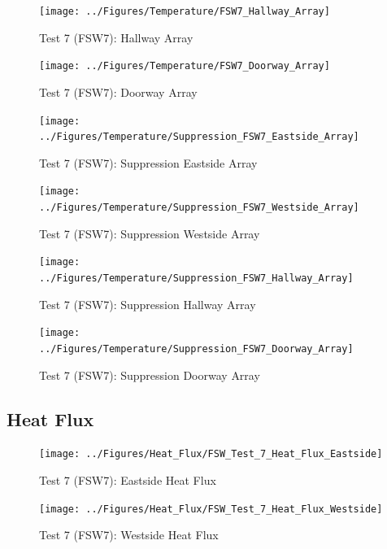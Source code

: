 \documentclass[12pt,oneside]{book}
\begin{document}
\begin{figure}[!ht]
	\texttt{[image: ../Figures/Temperature/FSW7\_Hallway\_Array]}
	\caption{Test 7 (FSW7): Hallway Array}
	\label{fig:Test_7_Hallway_Array}
\end{figure}

\begin{figure}[!ht]
	\texttt{[image: ../Figures/Temperature/FSW7\_Doorway\_Array]}
	\caption{Test 7 (FSW7): Doorway Array}
	\label{fig:Test_7_Doorway_Array}
\end{figure}

\begin{figure}[!ht]
	\texttt{[image: ../Figures/Temperature/Suppression\_FSW7\_Eastside\_Array]}
	\caption{Test 7 (FSW7): Suppression Eastside Array}
	\label{fig:Test_7_Suppression_Eastside_Array}
\end{figure}

\begin{figure}[!ht]
	\texttt{[image: ../Figures/Temperature/Suppression\_FSW7\_Westside\_Array]}
	\caption{Test 7 (FSW7): Suppression Westside Array}
	\label{fig:Test_7_Suppression_Westside_Array}
\end{figure}

\begin{figure}[!ht]
	\texttt{[image: ../Figures/Temperature/Suppression\_FSW7\_Hallway\_Array]}
	\caption{Test 7 (FSW7): Suppression Hallway Array}
	\label{fig:Test_7_Suppression_Hallway_Array}
\end{figure}

\begin{figure}[!ht]
	\texttt{[image: ../Figures/Temperature/Suppression\_FSW7\_Doorway\_Array]}
	\caption{Test 7 (FSW7): Suppression Doorway Array}
	\label{fig:Test_7_Suppression_Doorway_Array}
\end{figure}

\subsection{Heat Flux}
\label{subsec:Heat_Flux}

\begin{figure}[!ht]
	\texttt{[image: ../Figures/Heat\_Flux/FSW\_Test\_7\_Heat\_Flux\_Eastside]}
	\caption{Test 7 (FSW7): Eastside Heat Flux}
	\label{fig:Test_7_Eastside_Heat_Flux}
\end{figure}

\begin{figure}[!ht]
	\texttt{[image: ../Figures/Heat\_Flux/FSW\_Test\_7\_Heat\_Flux\_Westside]}
	\caption{Test 7 (FSW7): Westside Heat Flux}
	\label{fig:Test_7_Westside_Heat_Flux}
\end{figure}
\end{document}
